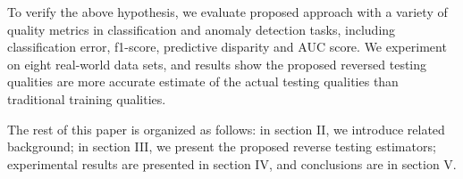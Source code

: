 To verify the above hypothesis, we evaluate proposed approach 
with a variety of quality metrics in classification and anomaly 
detection tasks, including classification error, f1-score, 
predictive disparity and AUC score. We experiment on eight real-world 
data sets, and results show the proposed reversed testing qualities 
are more accurate estimate of the actual testing qualities than 
traditional training qualities. 

The rest of this paper is organized as follows: in section
II, we introduce related background; in section III, we present 
the proposed reverse testing estimators; experimental results 
are presented in section IV, and conclusions are in section V.
